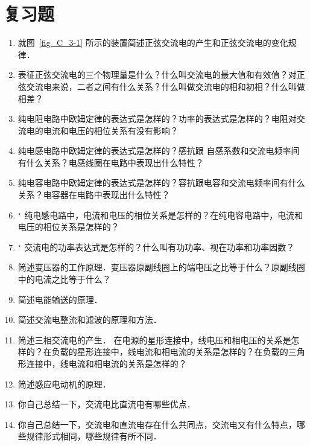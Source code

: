 \section*{复习题}
\begin{enumerate}
\item 就图~\ref{fig_C_3-1} 所示的装置简述正弦交流电的产生和正弦交流电的变化规律．
\item 表征正弦交流电的三个物理量是什么？什么叫交流电的最大值和有效值？对正弦交流电来说，二者之间有什么关系？什么叫做交流电的相和初相？什么叫做相差？
\item 纯电阻电路中欧姆定律的表达式是怎样的？功率的表达式是怎样的？电阻对交流电的电流和电压的相位关系有没有影响？
\item 纯电感电路中欧姆定律的表达式是怎样的？感抗跟
自感系数和交流电频率间有什么关系？电感线圈在电路中表现出什么特性？
\item 纯电容电路中欧姆定律的表达式是怎样的？容抗跟电容和交流电频率间有什么关系？电容器在电路中表现出什么特性？
\item$^\star$ 纯电感电路中，电流和电压的相位关系是怎样的？在纯电容电路中，电流和电压的相位关系是怎样的？
\item$^\star$ 交流电的功率表达式是怎样的？什么叫有功功率、视在功率和功率因数？
\item 简述变压器的工作原理．变压器原副线圈上的端电压之比等于什么？原副线圈中的电流之比等于什么？
\item 简述电能输送的原理．
\item 简述交流电整流和滤波的原理和方法．
\item 简述三相交流电的产生．
在电源的星形连接中，线电压和相电压的关系是怎样的？在负载的星形连接中，线电流和相电流的关系是怎样的？在负载的三角形连接中，线电流和相电流的关系是怎样的？
\item 简述感应电动机的原理．
\item 你自己总结一下，交流电比直流电有哪些优点．
\item 你自己总结一下，交流电和直流电存在什么共同点，交流电又有什么特点，哪些规律形式相同，哪些规律有所不同．
\end{enumerate}


